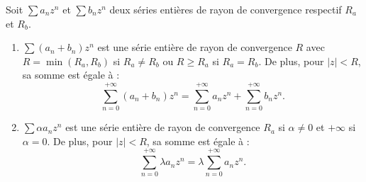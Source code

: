 \documentclass{book}
\begin{document}
\begin{Proposition}
Soit $\sum a_n z^n$ et $\sum b_n z^n$ deux séries entières de rayon de convergence respectif $R_a$ et $R_b$.
\begin{enumerate}
\item $\sum(a_n+b_n)z^n$ est une série entière de rayon de convergence $R$ avec $R = \min( R_a ,R_b )$  si $R_a \neq R_b$
ou $R \geq R_a$ si $R_a = R_b$. De plus, pour $|z|<R$, sa somme est égale à :
$$\sum_{n=0}^{+\infty}(a_n+b_n)z^n = \sum_{n=0}^{+\infty}a_nz^n +\sum_{n=0}^{+\infty}b_n z^n.$$ 
\item $\sum \alpha a_n z^n$ est une série entière de rayon de convergence $R_a$ si $\alpha\neq 0$ et $+\infty$ si $\alpha= 0$. De plus, pour $|z|<R$, sa somme est égale à :
$$\sum_{n=0}^{+\infty}\lambda a_nz^n = \lambda \sum_{n=0}^{+\infty}a_nz^n.$$ 
\end{enumerate}
\end{Proposition}
\end{document}
